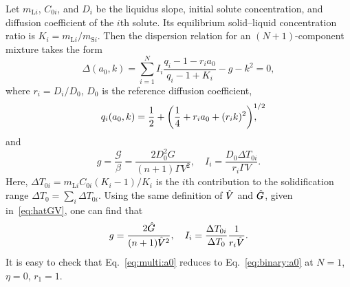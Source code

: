 \documentclass{article}
\newcommand{\liq}{\text{L}}
\newcommand{\sol}{\text{S}}
\newcommand{\hV}[1][\qty(\bar{V})]{\vphantom{#1}\mathrlap{\smash{\hat{V}}}V}
\newcommand{\hG}[1][\qty(\bar{G})]{\vphantom{#1}\mathrlap{\smash{\hat{G}}}G}
\begin{document}
Let $m_{\liq i}$, $C_{0i}$, and $D_i$ be the liquidus slope, initial solute concentration,
and diffusion coefficient of the $i$th solute.
Its equilibrium solid--liquid concentration ratio is $K_i = m_{\liq i}/m_{\sol i}$.
Then the dispersion relation for an $(N+1)$-component mixture takes the form
\begin{equation}\label{eq:multi:a0}
    \Delta(a_0,k) = \sum_{i=1}^{N}I_i\frac{q_i - 1 - r_ia_0}{q_i - 1 + K_i} - g - k^2 = 0,
\end{equation}
where $r_i = D_i/D_0$, $D_0$ is the reference diffusion coefficient,
\begin{equation}\label{eq:multi:q}
    q_i(a_0,k) = \frac12 + \qty(\frac14 + r_ia_0 + (r_ik)^2)^{\mathrlap{1/2}},
\end{equation}
and
\begin{equation}\label{eq:multi:gI}
    g = \frac{\mathcal{G}}{\beta} = \frac{2D_0^2G}{(n+1)\Gamma V^2}, \quad
    I_i = \frac{D_0\Delta{T}_{0i}}{r_i\Gamma V}.
\end{equation}
Here, $\Delta{T}_{0i} = m_{\liq i}C_{0i}(K_i-1)/K_i$ is the $i$th contribution to the solidification range
$\Delta{T}_0 = \sum_i \Delta{T}_{0i}$.
Using the same definition of $\hV$ and $\hG$, given in~\eqref{eq:hatGV}, one can find that
\begin{equation}\label{eq:multi:gI2}
    g = \frac{2\hG}{(n+1)\hV^2}, \quad I_i = \frac{\Delta{T}_{0i}}{\Delta{T}_0}\frac1{r_i\hV}.
\end{equation}
It is easy to check that Eq.~\eqref{eq:multi:a0} reduces to Eq.~\eqref{eq:binary:a0} at $N=1$, $\eta=0$, $r_1=1$.

\printbibliography
\end{document}
